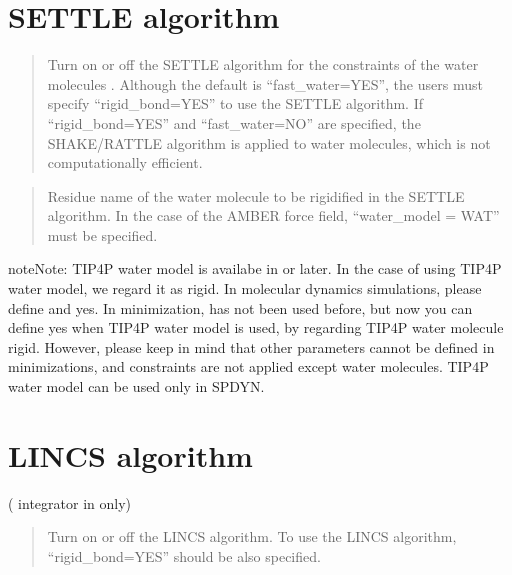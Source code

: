 \documentclass[a4paper,11pt,oneside,english]{sphinxmanual}
\begin{document}
\section{SETTLE algorithm}
\label{\detokenize{08_Constraints:settle-algorithm}}
 
\begin{quote}


Turn on or off the SETTLE algorithm for the constraints of the water molecules .
Although the default is “fast\_water=YES”, the users must specify “rigid\_bond=YES” to use the SETTLE algorithm.
If “rigid\_bond=YES” and “fast\_water=NO” are specified, the SHAKE/RATTLE algorithm is
applied to water molecules, which is not computationally efficient.
\end{quote}

 
\begin{quote}


Residue name of the water molecule to be rigidified in the SETTLE algorithm.
In the case of the AMBER force field, “water\_model = WAT” must be specified.
\end{quote}

\begin{sphinxadmonition}{note}{Note:}
TIP4P water model is availabe in  or later.
In the case of using TIP4P water model, we regard it as rigid. In
molecular dynamics simulations, please define  and 
yes. In minimization, \sphinxstylestrong{{[}Constraints{]}} has not been used before, but now
you can define  yes when TIP4P water model is used, by
regarding TIP4P water molecule rigid. However, please keep in mind that
other parameters cannot be defined in minimizations, and constraints are not
applied except water molecules. TIP4P water model can be used only in SPDYN.
\end{sphinxadmonition}


\section{LINCS algorithm}
\label{\detokenize{08_Constraints:lincs-algorithm}}
  ( integrator in  only)
\begin{quote}


Turn on or off the LINCS algorithm.
To use the LINCS algorithm, “rigid\_bond=YES” should be also specified.
\end{quote}
\end{document}
